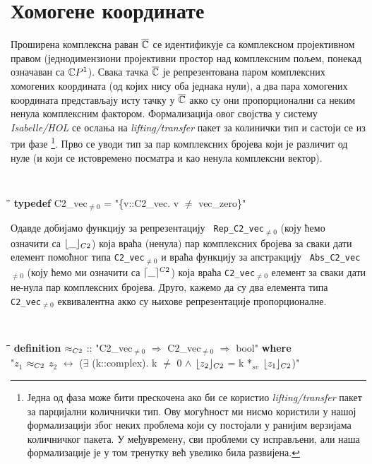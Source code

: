 \section{Хомогене координате}
\label{complex--homogene}
Проширена комплексна раван $\overline{\mathbb{C}}$ се идентификује са комплексном
пројективном правом (једнодимензиони пројективни простор над
комплексним пољем, понекад означаван са $\mathbb{C} P^1$). Свака тачка $\overline{\mathbb{C}}$
је репрезентована паром комплексних хомогених координата (од којих
нису оба једнака нули), а два пара хомогених координата представљају
исту тачку у $\overline{\mathbb{C}}$ акко су они пропорционални са неким ненула
комплексним фактором. Формализација овог својства у систему
\emph{Isabelle/HOL} се ослања на \emph{lifting/transfer} пакет за колинички
тип \cite{lifting-transfer} и састоји се из три фазе \footnote{Једна
  од фаза може бити прескочена ако би се користио \emph{lifting/transfer}
  пакет за парцијални количнички тип. Ову могућност ми нисмо користили
  у нашој формализацији због неких проблема који су постојали у
  ранијим верзијама количничког пакета. У међувремену, сви проблеми су
  исправљени, али наша формализације је у том тренутку већ увелико
  била развијена.}. Прво се уводи тип за пар комплексних бројева који
је различит од нуле (и који се истовремено посматра и као ненула
комплексни вектор).
{\tt
\begin{tabbing}
\hspace{5mm}\=\hspace{5mm}\=\hspace{5mm}\=\hspace{5mm}\=\hspace{5mm}\=\kill
\textbf{typedef} C2\_vec$_{\neq 0}$ = "\{v::C2\_vec. v $\neq$ vec\_zero\}"
\end{tabbing}
}
\noindent Одавде добијамо функцију за репрезентацију {\tt
  Rep\_C2\_vec$_{\neq 0}$} (коју ћемо означити са $\lfloor\_\rfloor_{C2}$) која
враћа (ненула) пар комплексних бројева за сваки дати елемент помоћног
типа {\tt C2\_vec$_{\neq 0}$} и враћа функцију за апстракцију {\tt
  Abs\_C2\_vec$_{\neq 0}$} (коју ћемо ми означити са $\lceil\_\rceil^{C2}$)
која враћа {\tt C2\_vec$_{\neq 0}$} елемент за сваки дати не-нула пар
комплексних бројева. Друго, кажемо да су два елемента типа {\tt
  C2\_vec$_{\neq 0}$} еквивалентна акко су њихове репрезентације
пропорционалне.

{\tt
\begin{tabbing}
\hspace{5mm}\=\hspace{5mm}\=\hspace{5mm}\=\hspace{5mm}\=\hspace{5mm}\=\kill
\textbf{definition} $\approx_{C2}$ :: "C2\_vec$_{\neq 0}$ $\Rightarrow$ C2\_vec$_{\neq 0}$ $\Rightarrow$ bool" \textbf{where}\\
\> "$z_1$ $\approx_{C2}$ $z_2$ $\longleftrightarrow$ ($\exists$ (k::complex). k $\neq$ 0 $\wedge$ $\lfloor z_2\rfloor_{C2}$ = k *$_{sv}$ $\lfloor z_1\rfloor_{C2}$)"
\end{tabbing}
}

